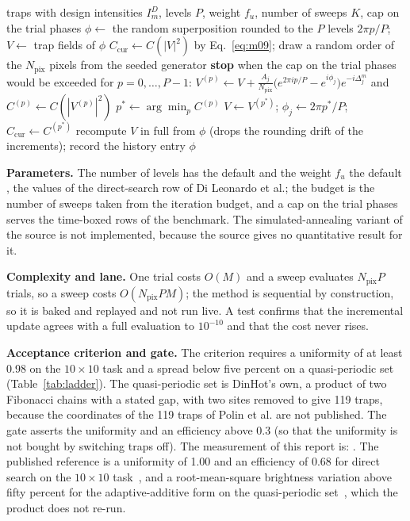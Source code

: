 \begin{algorithm}[t]
\caption{Direct search with the cost of Eq.~\eqref{eq:m09}. One sweep visits every pixel once in a seeded random order; the cost never increases.}
\label{alg:m09}
\begin{algorithmic}[1]
\Require traps with design intensities $I^D_m$, levels $P$, weight $f_u$, number of sweeps $K$, cap on the trial phases
\State $\phi\gets$ the random superposition rounded to the $P$ levels $2\pi p/P$; $V\gets$ trap fields of $\phi$
  \State $C_{\mathrm{cur}}\gets C(|V|^2)$ by Eq.~\eqref{eq:m09}; draw a random order of the $N_{\mathrm{pix}}$ pixels from the seeded generator
    \State \textbf{stop} when the cap on the trial phases would be exceeded
    \State for $p=0,\dots,P-1$: $V^{(p)}\gets V+\frac{A_j}{N_{\mathrm{pix}}}\big(e^{2\pi ip/P}-e^{i\phi_j}\big)e^{-i\Delta_j^m}$ and $C^{(p)}\gets C(|V^{(p)}|^2)$
    \State $p^\ast\gets\arg\min_pC^{(p)}$
     \State $V\gets V^{(p^\ast)}$; $\phi_j\gets2\pi p^\ast/P$; $C_{\mathrm{cur}}\gets C^{(p^\ast)}$ \EndIf
  \EndFor
  \State recompute $V$ in full from $\phi$ (drops the rounding drift of the increments); record the history entry
\EndFor
\State \Return $\phi$
\end{algorithmic}
\end{algorithm}

\textbf{Parameters.} The number of levels has the default  and the weight $f_u$ the default , the values of the direct-search row of Di Leonardo et al.; the budget is the number of sweeps taken from the iteration budget, and a cap on the trial phases serves the time-boxed rows of the benchmark. The simulated-annealing variant of the source is not implemented, because the source gives no quantitative result for it.

\textbf{Complexity and lane.} One trial costs $O(M)$ and a sweep evaluates $N_{\mathrm{pix}}P$ trials, so a sweep costs $O(N_{\mathrm{pix}}PM)$; the method is sequential by construction, so it is baked and replayed and not run live. A test confirms that the incremental update agrees with a full evaluation to $10^{-10}$ and that the cost never rises.

\textbf{Acceptance criterion and gate.} The criterion requires a uniformity of at least 0.98 on the $10\times10$ task and a spread below five percent on a quasi-periodic set (Table~\ref{tab:ladder}). The quasi-periodic set is DinHot's own, a product of two Fibonacci chains with a stated gap, with two sites removed to give 119 traps, because the coordinates of the 119 traps of Polin et al. are not published. The gate asserts the uniformity and an efficiency above 0.3 (so that the uniformity is not bought by switching traps off). The measurement of this report is: . The published reference is a uniformity of 1.00 and an efficiency of 0.68 for direct search on the $10\times10$ task~\cite{dileonardo}, and a root-mean-square brightness variation above fifty percent for the adaptive-additive form on the quasi-periodic set~\cite{polin}, which the product does not re-run.

